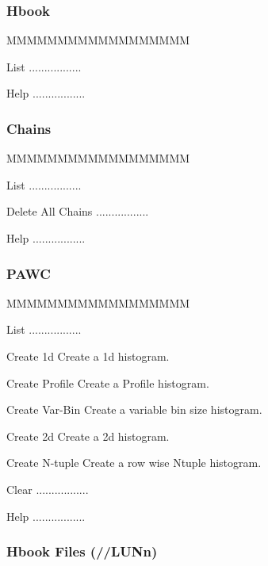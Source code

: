 \newpage
\subsubsection{Hbook}

\begin{DLsf}{MMMMMMMMMMMMMMMMMM}
\item[List]         .................
\item[Help]  .................
\end{DLsf}

\newpage
\subsubsection{Chains}

\begin{DLsf}{MMMMMMMMMMMMMMMMMM}
\item[List]         .................
\item[Delete All Chains]  .................
\item[Help]  .................
\end{DLsf}

\newpage
{}

\newpage
\subsubsection{PAWC}

\begin{DLsf}{MMMMMMMMMMMMMMMMMM}
\item[List]         .................
\item[Create 1d]      Create a 1d histogram.
\item[Create Profile] Create a Profile histogram.
\item[Create Var-Bin] Create a variable bin size histogram.
\item[Create 2d]      Create a 2d histogram.
\item[Create N-tuple] Create a row wise Ntuple histogram.
\item[Clear]  .................
\item[Help]  .................
\end{DLsf}

\newpage
\subsubsection{Hbook Files (//LUNn)}

